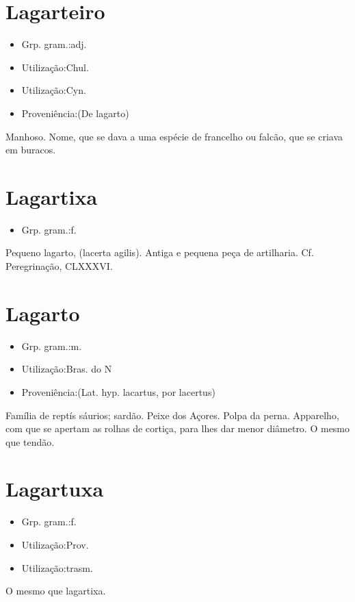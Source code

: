 \section{Lagarteiro}
\begin{itemize}
\item {Grp. gram.:adj.}
\end{itemize}
\begin{itemize}
\item {Utilização:Chul.}
\end{itemize}
\begin{itemize}
\item {Utilização:Cyn.}
\end{itemize}
\begin{itemize}
\item {Proveniência:(De \textunderscore lagarto\textunderscore )}
\end{itemize}
Manhoso.
Nome, que se dava a uma espécie de francelho ou falcão, que se criava em buracos.
\section{Lagartixa}
\begin{itemize}
\item {Grp. gram.:f.}
\end{itemize}
Pequeno lagarto, (\textunderscore lacerta agilis\textunderscore ).
Antiga e pequena peça de artilharia. Cf. \textunderscore Peregrinação\textunderscore , CLXXXVI.
\section{Lagarto}
\begin{itemize}
\item {Grp. gram.:m.}
\end{itemize}
\begin{itemize}
\item {Utilização:Bras. do N}
\end{itemize}
\begin{itemize}
\item {Proveniência:(Lat. hyp. \textunderscore lacartus\textunderscore , por \textunderscore lacertus\textunderscore )}
\end{itemize}
Família de reptís sáurios; sardão.
Peixe dos Açores.
Polpa da perna.
Apparelho, com que se apertam as rolhas de cortiça, para lhes dar menor diâmetro.
O mesmo que \textunderscore tendão\textunderscore .
\section{Lagartuxa}
\begin{itemize}
\item {Grp. gram.:f.}
\end{itemize}
\begin{itemize}
\item {Utilização:Prov.}
\end{itemize}
\begin{itemize}
\item {Utilização:trasm.}
\end{itemize}
O mesmo que \textunderscore lagartixa\textunderscore .
